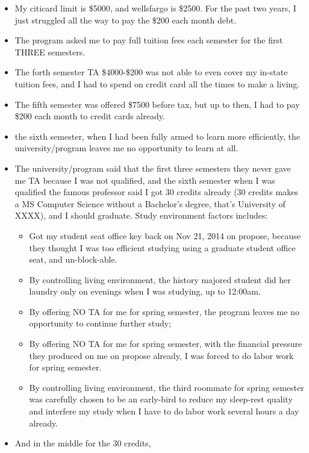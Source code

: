 \documentclass[9pt,b5paper]{article}
\begin{document}
\begin{itemize}
\item My citicard limit is \$5000, and wellsfargo is \$2500. For the past two years, I just struggled all the way to pay the \$200 each month debt.
\item The program asked me to pay full tuition fees each semester for the first THREE semesters.
\item The forth semester TA \$4000-\$200 was not able to even cover my in-state tuition fees, and I had to spend on credit card all the times to make a living.
\item The fifth semester was offered \$7500 before tax, but up to then, I had to pay \$200 each month to credit cards already.
\item the sixth semester, when I had been fully armed to learn more efficiently, the university/program leaves me no opportunity to learn at all.
\item The university/program said that the first three semesters they never gave me TA because I was not qualified, and the sixth semester when I was qualified the famous professor said I got 30 credits already (30 credits makes a MS Computer Science without a Bachelor's degree, that's University of XXXX), and I should graduate. Study environment factors includes: 
\begin{itemize}
\item Got my student seat office key back on Nov 21, 2014 on propose, because they thought I was too efficient studying using a graduate student office seat, and un-block-able.
\item By controlling living environment, the history majored student did her laundry only on evenings when I was studying, up to 12:00am.
\item By offering NO TA for me for spring semester, the program leaves me no opportunity to continue further study;
\item By offering NO TA for me for spring semester, with the financial pressure they produced on me on propose already, I was forced to do labor work for spring semester.
\item By controlling living environment, the third roommate for spring semester was carefully chosen to be an early-bird to reduce my sleep-rest quality and interfere my study when I have to do labor work several hours a day already.
\end{itemize}
\item And in the middle for the 30 credits, 
\begin{itemize}

\end{itemize}
\end{itemize}
\end{document}
